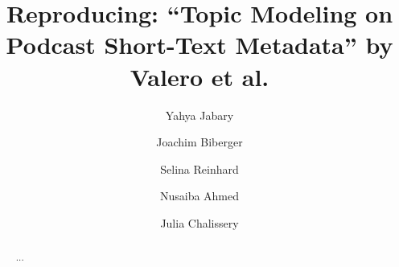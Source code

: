 \documentclass[manuscript]{acmart}
\begin{document}
\title{Reproducing: ``Topic Modeling on Podcast Short-Text Metadata'' by Valero et al.}

\author{Yahya Jabary}\authornotemark[1]
\author{Joachim Biberger}
\author{Selina Reinhard}
\author{Nusaiba Ahmed}
\author{Julia Chalissery}

\begin{abstract}
  ...
\end{abstract}


\end{document}
